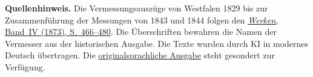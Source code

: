 \par\medskip\begin{small}\noindent\textbf{Quellenhinweis.} Die Vermessungsauszüge von Westfalen 1829 bis zur Zusammenführung der Messungen von 1843 und 1844 folgen den \href{https://gdz.sub.uni-goettingen.de/id/PPN236005081}{\textit{Werken}, Band~IV (1873), S.~466--480}. Die Überschriften bewahren die Namen der Vermesser aus der historischen Ausgabe. Die Texte wurden durch KI in modernes Deutsch übertragen. Die \href{https://github.com/KokunoYumeto/gauss-collected-works/releases/tag/gauss-original-language-2026-10-24}{originalsprachliche Ausgabe} steht gesondert zur Verfügung.\par\end{small}
